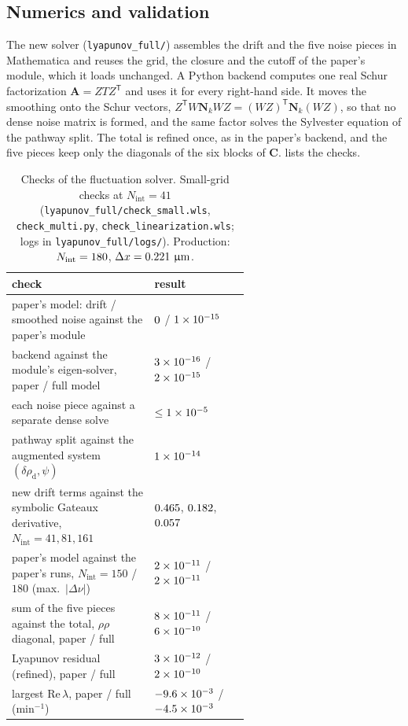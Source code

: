 \documentclass[11pt,a4paper]{article}
\newcommand{\micron}{\upmu\mathrm{m}}
\begin{document}
\subsection{Numerics and validation}
The new solver (\texttt{lyapunov\_full/}) assembles the drift and the five noise pieces in
Mathematica and reuses the grid, the closure and the cutoff of the paper's module, which it
loads unchanged. A Python backend computes one real Schur factorization $\mathbf A=Z T Z^{\mathsf T}$
and uses it for every right-hand side. It moves the smoothing onto the Schur vectors,
$Z^{\mathsf T}W\mathbf N_kWZ=(WZ)^{\mathsf T}\mathbf N_k(WZ)$, so that no dense noise matrix is formed,
and the same factor solves the Sylvester equation of the pathway split. The total is refined
once, as in the paper's backend, and the five pieces keep only the diagonals of the six
blocks of $\mathbf C$.  lists the checks.

\begin{table}[t]
  \centering
  \caption{Checks of the fluctuation solver. Small-grid checks at $N_\mathrm{int}=41$
    (\texttt{lyapunov\_full/check\_small.wls}, \texttt{check\_multi.py},
    \texttt{check\_linearization.wls}; logs in \texttt{lyapunov\_full/logs/}). Production:
    $N_\mathrm{int}=180$, $\Delta x=\nfh~\micron$.}
  \label{tab:fluct-validation}
  \small
  \begin{tabular}{p{0.6\linewidth}l}
    \toprule
    check & result\\
    \midrule
    paper's model: drift / smoothed noise against the paper's module & $0$ / $1\times10^{-15}$\\
    backend against the module's eigen-solver, paper / full model & $3\times10^{-16}$ / $2\times10^{-15}$\\
    each noise piece against a separate dense solve & $\le1\times10^{-5}$\\
    pathway split against the augmented system $(\delta\rho_\mathrm d,\psi)$ & $1\times10^{-14}$\\
    new drift terms against the symbolic Gateaux derivative, $N_\mathrm{int}=41,81,161$ & $0.465$, $0.182$, $0.057$\\
    paper's model against the paper's runs, $N_\mathrm{int}=150$ / $180$ (max.\ $|\Delta\nu|$) & $2\times10^{-11}$ / $2\times10^{-11}$\\
    sum of the five pieces against the total, $\rho\rho$ diagonal, paper / full & $8\times10^{-11}$ / $6\times10^{-10}$\\
    Lyapunov residual (refined), paper / full & $3\times10^{-12}$ / $2\times10^{-10}$\\
    largest $\mathrm{Re}\,\lambda$, paper / full (min$^{-1}$) & $-9.6\times10^{-3}$ / $-4.5\times10^{-3}$\\
    \bottomrule
  \end{tabular}
\end{table}
\end{document}
